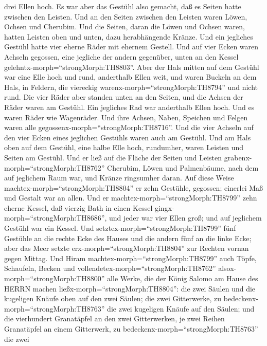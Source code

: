drei Ellen hoch.  Es war aber das Gestühl also gemacht, daß
es Seiten hatte zwischen den Leisten.  Und an den Seiten
zwischen den Leisten waren Löwen, Ochsen und Cherubim. Und die Seiten,
daran die Löwen und Ochsen waren, hatten Leisten oben und unten, dazu
herabhängende Kränze.  Und ein jegliches Gestühl hatte vier
eherne Räder mit ehernem Gestell. Und auf vier Ecken waren Achseln
gegossen, eine jegliche der andern gegenüber, unten an den Kessel
gelehntx-morph=``strongMorph:TH8803''.  Aber der Hals
mitten auf dem Gestühl war eine Elle hoch und rund, anderthalb Ellen
weit, und waren Buckeln an dem Hals, in Feldern, die viereckig
warenx-morph=``strongMorph:TH8794'' und nicht rund.  Die
vier Räder aber standen unten an den Seiten, und die Achsen der Räder
waren am Gestühl. Ein jegliches Rad war anderthalb Ellen hoch.
 Und es waren Räder wie Wagenräder. Und ihre Achsen, Naben,
Speichen und Felgen waren alle gegossenx-morph=``strongMorph:TH8716''.
 Und die vier Achseln auf den vier Ecken eines jeglichen
Gestühls waren auch am Gestühl.  Und am Hals oben auf dem
Gestühl, eine halbe Elle hoch, rundumher, waren Leisten und Seiten am
Gestühl.  Und er ließ auf die Fläche der Seiten und Leisten
grabenx-morph=``strongMorph:TH8762'' Cherubim, Löwen und Palmenbäume,
nach dem auf jeglichem Raum war, und Kränze ringsumher daran.
 Auf diese Weise machtex-morph=``strongMorph:TH8804'' er
zehn Gestühle, gegossen; einerlei Maß und Gestalt war an allen.
 Und er machtex-morph=``strongMorph:TH8799'' zehn eherne
Kessel, daß vierzig Bath in einen Kessel
gingx-morph=``strongMorph:TH8686'', und jeder war vier Ellen groß; und
auf jeglichem Gestühl war ein Kessel.  Und
setztex-morph=``strongMorph:TH8799'' fünf Gestühle an die rechte Ecke
des Hauses und die andern fünf an die linke Ecke; aber das Meer setzte
erx-morph=``strongMorph:TH8804'' zur Rechten vornan gegen Mittag.
 Und Hiram machtex-morph=``strongMorph:TH8799'' auch Töpfe,
Schaufeln, Becken und vollendetex-morph=``strongMorph:TH8762''
alsox-morph=``strongMorph:TH8800'' alle Werke, die der König Salomo am
Hause des HERRN machen ließx-morph=``strongMorph:TH8804'': 
die zwei Säulen und die kugeligen Knäufe oben auf den zwei Säulen; die
zwei Gitterwerke, zu bedeckenx-morph=``strongMorph:TH8763'' die zwei
kugeligen Knäufe auf den Säulen;  und die vierhundert
Granatäpfel an den zwei Gitterwerken, je zwei Reihen Granatäpfel an
einem Gitterwerk, zu bedeckenx-morph=``strongMorph:TH8763'' die zwei
